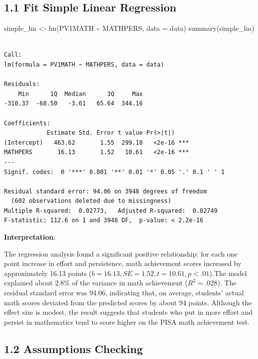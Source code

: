\documentclass[
  letterpaper,
  DIV=11,
  numbers=noendperiod]{scrreprt}
\newenvironment{Shaded}{\begin{snugshade}}{\end{snugshade}}
\newcommand{\AttributeTok}[1]{\textcolor[rgb]{0.40,0.45,0.13}{#1}}
\newcommand{\FunctionTok}[1]{\textcolor[rgb]{0.28,0.35,0.67}{#1}}
\newcommand{\NormalTok}[1]{\textcolor[rgb]{0.00,0.23,0.31}{#1}}
\newcommand{\OtherTok}[1]{\textcolor[rgb]{0.00,0.23,0.31}{#1}}
\newcommand{\SpecialCharTok}[1]{\textcolor[rgb]{0.37,0.37,0.37}{#1}}
\begin{document}
\subsection*{1.1 Fit Simple Linear
Regression}\label{fit-simple-linear-regression}

\begin{Shaded}
\begin{Highlighting}[]
\NormalTok{simple\_lm }\OtherTok{\textless{}{-}} \FunctionTok{lm}\NormalTok{(PV1MATH }\SpecialCharTok{\textasciitilde{}}\NormalTok{ MATHPERS, }\AttributeTok{data =}\NormalTok{ data) }
\FunctionTok{summary}\NormalTok{(simple\_lm)}
\end{Highlighting}
\end{Shaded}

\begin{verbatim}

Call:
lm(formula = PV1MATH ~ MATHPERS, data = data)

Residuals:
    Min      1Q  Median      3Q     Max 
-310.37  -68.50   -3.61   65.64  344.16 

Coefficients:
            Estimate Std. Error t value Pr(>|t|)    
(Intercept)   463.62       1.55  299.18   <2e-16 ***
MATHPERS       16.13       1.52   10.61   <2e-16 ***
---
Signif. codes:  0 '***' 0.001 '**' 0.01 '*' 0.05 '.' 0.1 ' ' 1

Residual standard error: 94.06 on 3948 degrees of freedom
  (602 observations deleted due to missingness)
Multiple R-squared:  0.02773,   Adjusted R-squared:  0.02749 
F-statistic: 112.6 on 1 and 3948 DF,  p-value: < 2.2e-16
\end{verbatim}

\textbf{Interpretation}:

The regression analysis found a significant positive relationship: for
each one point increase in effort and persistence, math achievement
scores increased by approximately 16.13 points
(\(b=16.13,SE=1.52,t=10.61,p<.01\)).The model explained about 2.8\% of
the variance in math achievement (\(R^2 = .028\)). The residual standard
error was 94.06, indicating that, on average, students' actual math
scores deviated from the predicted scores by about 94 points. Although
the effect size is modest, the result suggests that students who put in
more effort and persist in mathematics tend to score higher on the PISA
math achievement test.

\subsection*{1.2 Assumptions Checking}\label{assumptions-checking}
\end{document}
